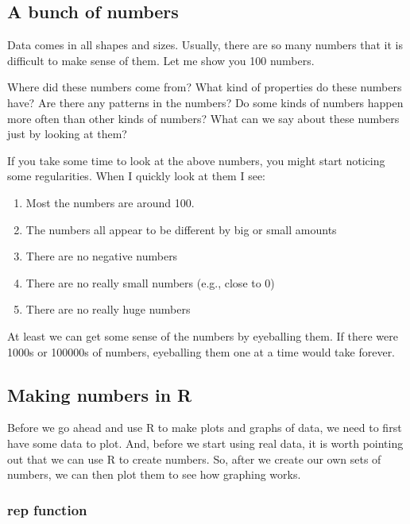\documentclass[]{book}
\providecommand{\tightlist}{%
  \setlength{\itemsep}{0pt}\setlength{\parskip}{0pt}}
\theoremstyle{definition}
\theoremstyle{definition}
\theoremstyle{definition}
\theoremstyle{remark}
\begin{document}
\subsection{A bunch of numbers}\label{a-bunch-of-numbers}

Data comes in all shapes and sizes. Usually, there are so many numbers
that it is difficult to make sense of them. Let me show you 100 numbers.

Where did these numbers come from? What kind of properties do these
numbers have? Are there any patterns in the numbers? Do some kinds of
numbers happen more often than other kinds of numbers? What can we say
about these numbers just by looking at them?

If you take some time to look at the above numbers, you might start
noticing some regularities. When I quickly look at them I see:

\begin{enumerate}
\def\labelenumi{\arabic{enumi}.}
\tightlist
\item
  Most the numbers are around 100.
\item
  The numbers all appear to be different by big or small amounts
\item
  There are no negative numbers
\item
  There are no really small numbers (e.g., close to 0)
\item
  There are no really huge numbers
\end{enumerate}

At least we can get some sense of the numbers by eyeballing them. If
there were 1000s or 100000s of numbers, eyeballing them one at a time
would take forever.

\subsection{Making numbers in R}\label{making-numbers-in-r}

Before we go ahead and use R to make plots and graphs of data, we need
to first have some data to plot. And, before we start using real data,
it is worth pointing out that we can use R to create numbers. So, after
we create our own sets of numbers, we can then plot them to see how
graphing works.

\subsubsection{rep function}\label{rep-function}
\end{document}
